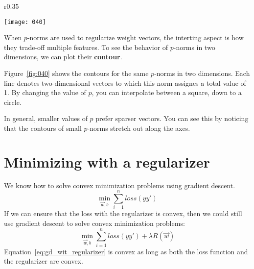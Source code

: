 \begin{wrapfigure}{r}{0.35\textwidth}
\begin{center}
    \vspace*{-20pt}
    \texttt{[image: 040]}
    \caption{\(p\)-norms visualized}
    \vspace*{-40pt}
\end{center}
\label{fig:040}
\end{wrapfigure}

When \(p\)-norms are used to regularize weight vectors, the interting aspect is how they trade-off multiple features. To see the behavior of \(p\)-norms in two dimensions, we can plot their \textbf{contour}.

Figure~\ref{fig:040} shows the contours for the same \(p\)-norms in two dimensions. Each line denotes two-dimensional vectors to which this norm assignes a total value of 1. By changing the value of \(p\), you can interpolate between a square, down to a circle.

In general, smaller values of \(p\) prefer sparser vectors. You can see this by noticing that the contours of small \(p\)-norms stretch out along the axes.

\section{Minimizing with a regularizer}
We know how to solve convex minimization problems using gradient descent.
\begin{equation*}
    \min_{\vec{w},b} \sum_{i=1}^n loss(yy')
\end{equation*}
If we can ensure that the loss with the regularizer is convex, then we could still use gradient descent to solve convex minimization problems:
\begin{equation}
    \label{eq:gd_wit_regularizer}
    \min_{\vec{w},b} \sum_{i=1}^n loss(yy') + \lambda R(\vec{w})
\end{equation}
Equation~\ref{eq:gd_wit_regularizer} is convex as long as both the loss function and the regularizer are convex.

